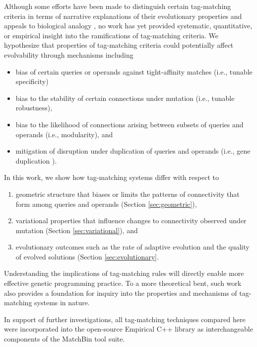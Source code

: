 Although some efforts have been made to distinguish certain tag-matching criteria in terms of narrative explanations of their evolutionary properties and appeals to biological analogy \citep{downing2015intelligence,scherer2004activation}, no work has yet provided systematic, quantitative, or empirical insight into the ramifications of tag-matching criteria.
We hypothesize that properties of tag-matching criteria could potentially affect evolvability through mechanisms including
\begin{itemize}
  \item bias of certain queries or operands against tight-affinity matches (i.e., tunable specificity)
  \item bias to the stability of certain connections under mutation (i.e., tunable robustness),
  \item bias to the likelihood of connections arising between subsets of queries and operands (i.e., modularity), and
  \item mitigation of disruption under duplication of queries and operands (i.e., gene duplication \citep{ohno2013evolution, lewis1978gene}).
\end{itemize}

In this work, we show how tag-matching systems differ with respect to
\begin{enumerate}
  \item geometric structure that biases or limits the patterns of connectivity that form among queries and operands (Section \ref{sec:geometric}),
  \item variational properties that influence changes to connectivity observed under mutation (Section \ref{sec:variational}), and
  \item evolutionary outcomes such as the rate of adaptive evolution and the quality of evolved solutions (Section \ref{sec:evolutionary}.
\end{enumerate}
Understanding the implications of tag-matching rules will directly enable more effective genetic programming practice.
To a more theoretical bent, such work also provides a foundation for inquiry into the properties and mechanisms of tag-matching systems in nature.

In support of further investigations, all tag-matching techniques compared here were incorporated into the open-source Empirical C++ library \citep{charles_ofria_2019_2575607} as interchangeable components of the MatchBin tool suite.

